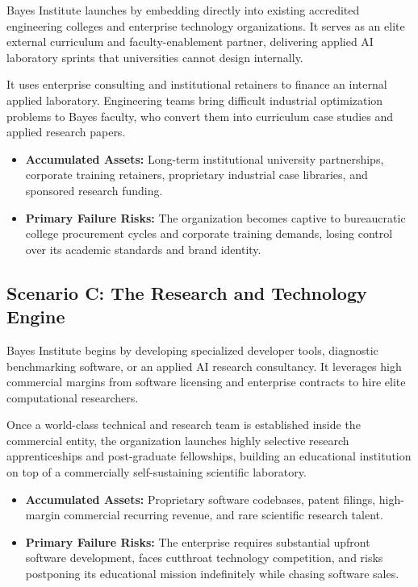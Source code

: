 Bayes Institute launches by embedding directly into existing accredited engineering colleges and enterprise technology organizations. It serves as an elite external curriculum and faculty-enablement partner, delivering applied AI laboratory sprints that universities cannot design internally.

It uses enterprise consulting and institutional retainers to finance an internal applied laboratory. Engineering teams bring difficult industrial optimization problems to Bayes faculty, who convert them into curriculum case studies and applied research papers.

\begin{itemize}[leftmargin=11pt,itemsep=1.5pt,topsep=1.5pt,parsep=0pt]
  \item \textbf{Accumulated Assets:} Long-term institutional university partnerships, corporate training retainers, proprietary industrial case libraries, and sponsored research funding.
  \item \textbf{Primary Failure Risks:} The organization becomes captive to bureaucratic college procurement cycles and corporate training demands, losing control over its academic standards and brand identity.
\end{itemize}

\subsection{Scenario C: The Research and Technology Engine}

Bayes Institute begins by developing specialized developer tools, diagnostic benchmarking software, or an applied AI research consultancy. It leverages high commercial margins from software licensing and enterprise contracts to hire elite computational researchers.

Once a world-class technical and research team is established inside the commercial entity, the organization launches highly selective research apprenticeships and post-graduate fellowships, building an educational institution on top of a commercially self-sustaining scientific laboratory.

\begin{itemize}[leftmargin=11pt,itemsep=1.5pt,topsep=1.5pt,parsep=0pt]
  \item \textbf{Accumulated Assets:} Proprietary software codebases, patent filings, high-margin commercial recurring revenue, and rare scientific research talent.
  \item \textbf{Primary Failure Risks:} The enterprise requires substantial upfront software development, faces cutthroat technology competition, and risks postponing its educational mission indefinitely while chasing software sales.
\end{itemize}

